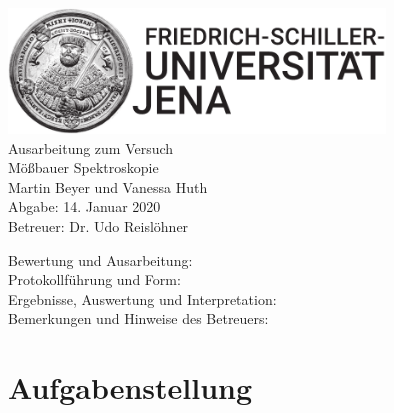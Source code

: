 \documentclass[a4paper,twoside,final]{article}
\begin{document}
\setlength{\marginparsep}{2em}
\renewcommand{\theequation}{\arabic{section}.\arabic{equation}}
\renewcommand{\thefigure}{\arabic{section}.\arabic{figure}}
\renewcommand{\thetable}{\arabic{section}.\arabic{table}}

\begin{center}
\thispagestyle{empty}
  \includegraphics[width=0.75\textwidth]{../UniJena_BildWortMarke_black.pdf}\\[4em]
  \Large
  Ausarbeitung zum Versuch\\[2em]
  \Huge
  Mößbauer Spektroskopie\\
  \vspace{2cm}
  \Large
  Martin Beyer und Vanessa Huth\\[2em]
  Abgabe: 14. Januar 2020\\[2em]
  Betreuer: Dr. Udo Reislöhner\\[5em]
  \begin{flushleft}
  	Bewertung und Ausarbeitung:\\[2em]
		Protokollführung und Form:\\[1em]
		Ergebnisse, Auswertung und Interpretation:\\[1em]
		Bemerkungen und Hinweise des Betreuers:
  \end{flushleft}
\end{center}
\clearpage

\pagestyle{fancy}
\renewcommand{\headrulewidth}{0pt}
\renewcommand{\footrulewidth}{0.5pt}
\renewcommand{\sectionmark}[1]{\markright{#1}}
\fancyhead[RE,LO]{\rightmark}
\fancyfoot[LE,RO]{\bfseries\thepage}
\renewcommand{\headrulewidth}{0.5pt}
\renewcommand{\footrulewidth}{0.5pt}

\setcounter{equation}{0}
\setcounter{figure}{0}

\tableofcontents
\newpage
\section{Aufgabenstellung} \label{sec:Aufgabenstellung}
\end{document}

